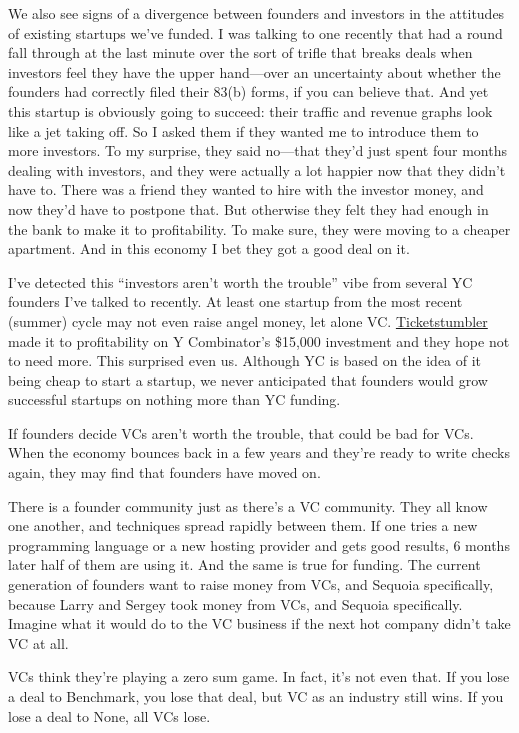 \documentclass[12pt]{book}
\begin{document}
We also see signs of a divergence between founders and investors in the
attitudes of existing startups we've funded. I was talking to one
recently that had a round fall through at the last minute over the sort
of trifle that breaks deals when investors feel they have the upper
hand---over an uncertainty about whether the founders had correctly
filed their 83(b) forms, if you can believe that. And yet this startup
is obviously going to succeed: their traffic and revenue graphs look
like a jet taking off. So I asked them if they wanted me to introduce
them to more investors. To my surprise, they said no---that they'd just
spent four months dealing with investors, and they were actually a lot
happier now that they didn't have to. There was a friend they wanted to
hire with the investor money, and now they'd have to postpone that. But
otherwise they felt they had enough in the bank to make it to
profitability. To make sure, they were moving to a cheaper apartment.
And in this economy I bet they got a good deal on it.

I've detected this ``investors aren't worth the trouble'' vibe from
several YC founders I've talked to recently. At least one startup from
the most recent (summer) cycle may not even raise angel money, let alone
VC. \href{http://ticketstumbler.com}{Ticketstumbler} made it to
profitability on Y Combinator's \$15,000 investment and they hope not to
need more. This surprised even us. Although YC is based on the idea of
it being cheap to start a startup, we never anticipated that founders
would grow successful startups on nothing more than YC funding.

If founders decide VCs aren't worth the trouble, that could be bad for
VCs. When the economy bounces back in a few years and they're ready to
write checks again, they may find that founders have moved on.

There is a founder community just as there's a VC community. They all
know one another, and techniques spread rapidly between them. If one
tries a new programming language or a new hosting provider and gets good
results, 6 months later half of them are using it. And the same is true
for funding. The current generation of founders want to raise money from
VCs, and Sequoia specifically, because Larry and Sergey took money from
VCs, and Sequoia specifically. Imagine what it would do to the VC
business if the next hot company didn't take VC at all.

VCs think they're playing a zero sum game. In fact, it's not even that.
If you lose a deal to Benchmark, you lose that deal, but VC as an
industry still wins. If you lose a deal to None, all VCs lose.
\end{document}
